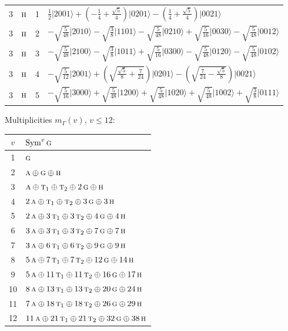 \documentclass[11pt]{article}
\newcommand{\irr}[1]{\text{\normalfont\scshape #1}}
\newcommand{\occ}[1]{\lvert #1\rangle}
\begin{document}
\begin{longtable}{c l c p{}}
3 & $\irr{h}$ & 1 & $\tfrac{1}{2}\occ{2001}+(- \frac{1}{4} + \frac{\sqrt{5}}{4})\occ{0201}-(\frac{1}{4} + \frac{\sqrt{5}}{4})\occ{0021}$\\
3 & $\irr{h}$ & 2 & $-\sqrt{\tfrac{5}{48}}\occ{2010}-\sqrt{\tfrac{3}{8}}\occ{1101}-\sqrt{\tfrac{5}{48}}\occ{0210}+\sqrt{\tfrac{5}{16}}\occ{0030}-\sqrt{\tfrac{5}{48}}\occ{0012}$\\
3 & $\irr{h}$ & 3 & $-\sqrt{\tfrac{5}{48}}\occ{2100}-\sqrt{\tfrac{3}{8}}\occ{1011}+\sqrt{\tfrac{5}{16}}\occ{0300}-\sqrt{\tfrac{5}{48}}\occ{0120}-\sqrt{\tfrac{5}{48}}\occ{0102}$\\
3 & $\irr{h}$ & 4 & $-\sqrt{\tfrac{5}{12}}\occ{2001}+(\sqrt{\frac{\sqrt{5}}{8} + \frac{7}{24}})\occ{0201}-(\sqrt{\frac{7}{24} - \frac{\sqrt{5}}{8}})\occ{0021}$\\
3 & $\irr{h}$ & 5 & $-\sqrt{\tfrac{5}{16}}\occ{3000}+\sqrt{\tfrac{5}{48}}\occ{1200}+\sqrt{\tfrac{5}{48}}\occ{1020}+\sqrt{\tfrac{5}{48}}\occ{1002}+\sqrt{\tfrac{3}{8}}\occ{0111}$\\
\hline
\end{longtable}

Multiplicities $m_\Gamma(v)$, $v\le12$:
\begin{longtable}{c l}\hline $v$ & $\operatorname{Sym}^{v}\irr{g}$\\ \hline\endhead
1 & $\irr{g}$\\
2 & $\irr{a}\oplus \irr{g}\oplus \irr{h}$\\
3 & $\irr{a}\oplus \irr{t}_{1}\oplus \irr{t}_{2}\oplus 2\,\irr{g}\oplus \irr{h}$\\
4 & $2\,\irr{a}\oplus \irr{t}_{1}\oplus \irr{t}_{2}\oplus 3\,\irr{g}\oplus 3\,\irr{h}$\\
5 & $2\,\irr{a}\oplus 3\,\irr{t}_{1}\oplus 3\,\irr{t}_{2}\oplus 4\,\irr{g}\oplus 4\,\irr{h}$\\
6 & $3\,\irr{a}\oplus 3\,\irr{t}_{1}\oplus 3\,\irr{t}_{2}\oplus 7\,\irr{g}\oplus 7\,\irr{h}$\\
7 & $3\,\irr{a}\oplus 6\,\irr{t}_{1}\oplus 6\,\irr{t}_{2}\oplus 9\,\irr{g}\oplus 9\,\irr{h}$\\
8 & $5\,\irr{a}\oplus 7\,\irr{t}_{1}\oplus 7\,\irr{t}_{2}\oplus 12\,\irr{g}\oplus 14\,\irr{h}$\\
9 & $5\,\irr{a}\oplus 11\,\irr{t}_{1}\oplus 11\,\irr{t}_{2}\oplus 16\,\irr{g}\oplus 17\,\irr{h}$\\
10 & $8\,\irr{a}\oplus 13\,\irr{t}_{1}\oplus 13\,\irr{t}_{2}\oplus 20\,\irr{g}\oplus 24\,\irr{h}$\\
11 & $7\,\irr{a}\oplus 18\,\irr{t}_{1}\oplus 18\,\irr{t}_{2}\oplus 26\,\irr{g}\oplus 29\,\irr{h}$\\
12 & $11\,\irr{a}\oplus 21\,\irr{t}_{1}\oplus 21\,\irr{t}_{2}\oplus 32\,\irr{g}\oplus 38\,\irr{h}$\\
\hline\end{longtable}
\end{document}
